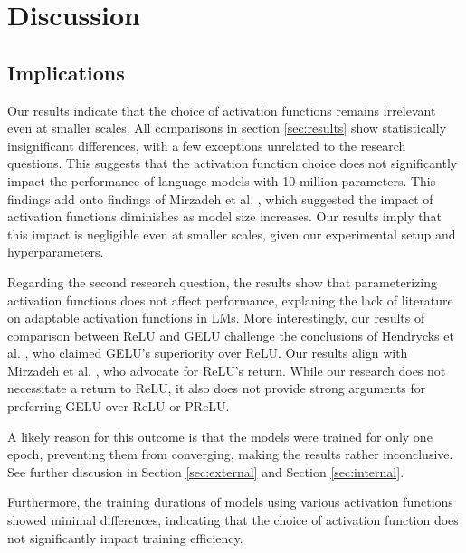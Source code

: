 \section{Discussion} %
\label{sec:discussion}

\subsection{Implications}
Our results indicate that the choice of activation functions remains irrelevant even at smaller scales. All comparisons in section \ref{sec:results} show statistically insignificant differences, with a few exceptions unrelated to the research questions. This suggests that the activation function choice does not significantly impact the performance of language models with 10 million parameters. This findings add onto findings of Mirzadeh et al. \cite{Mirzadeh2023}, which suggested the impact of activation functions diminishes as model size increases. Our results imply that this impact is negligible even at smaller scales, given our experimental setup and hyperparameters.

Regarding the second research question, the results show that parameterizing activation functions does not affect performance, explaning the lack of literature on adaptable activation functions in LMs. More interestingly, our results of comparison between ReLU and GELU challenge the conclusions of Hendrycks et al. \cite{Hendrycks2023}, who claimed GELU's superiority over ReLU. Our results align with Mirzadeh et al. \cite{Mirzadeh2023}, who advocate for ReLU's return. While our research does not necessitate a return to ReLU, it also does not provide strong arguments for preferring GELU over ReLU or PReLU.

A likely reason for this outcome is that the models were trained for only one epoch, preventing them from converging, making the results rather inconclusive. See further discusion in Section \ref{sec:external} and Section \ref{sec:internal}.

Furthermore, the training durations of models using various activation functions showed minimal differences, indicating that the choice of activation function does not significantly impact training efficiency.

